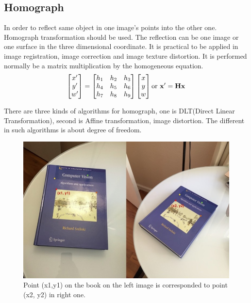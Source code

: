 \documentclass[senior]{IPSstyle}
\begin{document}
\subsection{Homograph}

In order to reflect same object in one image's points into the other one. 
Homograph transformation should be used.
The reflection can be one image or one surface in the three dimensional coordinate.
It is practical to be applied in image registration, image correction and image texture distortion.
It is performed normally be a matrix multiplication by the homogeneous equation.
\[\begin{bmatrix} x'\\ y'\\ w' \end{bmatrix} = \begin{bmatrix} h_1 & h_2 & h_3\\ h_4 & h_5&h_6 \\ h_7 & h_8 & h_9 \end{bmatrix} \begin{bmatrix} x\\ y\\ w \end{bmatrix} \text{or } \bold{x'= Hx}\]

There are three kinds of algorithms for homograph, one is DLT(Direct Linear Transformation), second is Affine transformation, image distortion.
The different in such algorithms is about degree of freedom. 

\begin{figure}[h!]
    \centering
    \includegraphics[width=15cm]{MasterThesis-master/images/homography_example.jpg}
    \caption{Point (x1,y1) on the book on the left image is corresponded to point (x2, y2) in right one.}
    \label{fig:homography_example}
\end{figure}
\end{document}
